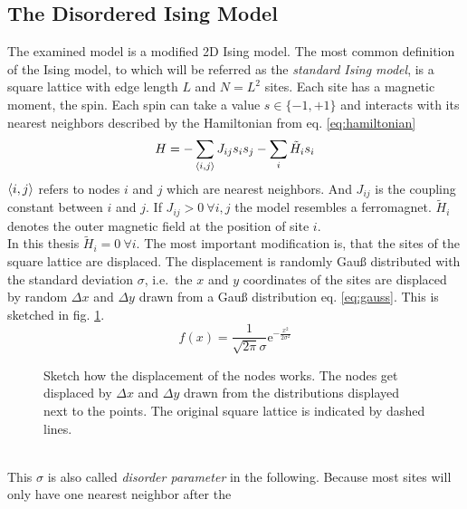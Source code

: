 \subsection{The Disordered Ising Model}
\label{ssec:isingmodel}
    The examined model is a modified 2D Ising model.
    The most common definition of the Ising model, to which will be referred
    as the \emph{standard Ising model}, is a square lattice with edge length \(L\) and
    \(N=L^2\) sites. Each site has a magnetic moment, the spin. Each
    spin can take a value \(s \in \{-1,+1\}\) and interacts with its
    nearest neighbors described by the Hamiltonian from eq. \eqref{eq:hamiltonian}
    \begin{equation}
        H = - \sum_{\left< i,j \right>}J_{ij}s_{i}s_{j} - \sum_i \tilde{H}_i s_i
        \label{eq:hamiltonian}
    \end{equation}
    \(\left< i,j \right>\) refers to nodes \(i\) and \(j\) which are nearest
    neighbors. And \(J_{ij}\) is the coupling constant between \(i\) and
    \(j\). If \(J_{ij} > 0 \ \forall i,j\) the model resembles a ferromagnet.
    \(\tilde{H}_i\) denotes the outer magnetic field at the position of
    site \(i\).\\
    In this thesis \(\tilde{H}_i=0 \ \forall i\). The most important
    modification is, that the sites of the square lattice are displaced.
    The displacement is randomly Gauß distributed with the standard
    deviation \(\sigma\), i.e.\ the \(x\) and \(y\) coordinates of the
    sites are displaced by random \(\Delta x\) and \(\Delta y\) drawn
    from a Gauß distribution eq. \eqref{eq:gauss}.
    This is sketched in fig. \ref{fig:displacement}.
    \begin{equation}
        f(x)=\frac{1}{\sqrt{2\pi}\sigma}\mathrm{e}^{-\frac{x^2}{2\sigma^2}}
        \label{eq:gauss}
    \end{equation}
    \begin{figure}[htbp]
        \centering
        
        \caption[Sketch how the Displacement Works]
        {
            Sketch how the displacement of the nodes works. The nodes
            get displaced by \(\Delta x\) and \(\Delta y\) drawn from the
            distributions displayed next to the points. The original
            square lattice is indicated by dashed lines.
        }
        \label{fig:displacement}
    \end{figure}\\
    This \(\sigma\) is also called \emph{disorder parameter} in the following.
    Because most sites will only have one nearest neighbor after the

